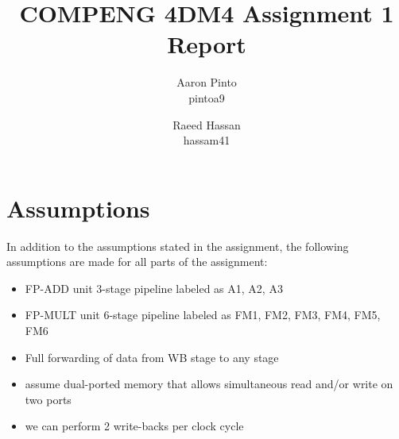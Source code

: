 \documentclass[12pt]{article}
\title{COMPENG 4DM4 Assignment 1 Report}
\author{
    Aaron Pinto \\
    pintoa9 \\
    \and
    Raeed Hassan \\
    hassam41 \\
}
\begin{document}
\maketitle
\clearpage

\section*{Assumptions}
In addition to the assumptions stated in the assignment, the following assumptions are made for all parts of the assignment:
\begin{itemize}
    \item FP-ADD unit 3-stage pipeline labeled as A1, A2, A3
    \item FP-MULT unit 6-stage pipeline labeled as FM1, FM2, FM3, FM4, FM5, FM6
    \item Full forwarding of data from WB stage to any stage
	\item assume dual-ported memory that allows simultaneous read and/or write on two ports
	\item we can perform 2 write-backs per clock cycle
\end{itemize}










\end{document}
